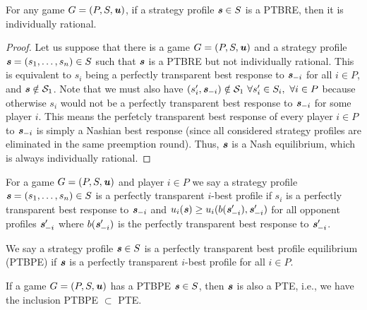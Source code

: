 \begin{lemma}
	For any game $G = (P, S, \boldsymbol{\mathit{u}})$, if a strategy profile $\boldsymbol{\mathit{s}} \in S$ is a PTBRE, then it is individually rational.
\end{lemma}

\begin{proof}
	Let us suppose that there is a game $G = (P, S, \boldsymbol{\mathit{u}})$ and a strategy profile $\boldsymbol{\mathit{s}} = (s_1, \dots, s_n) \in S$ such that $\boldsymbol{\mathit{s}}$ is a PTBRE but not individually rational.
	This is equivalent to $s_i$ being a perfectly transparent best response to $\boldsymbol{\mathit{s}}_{-i}$ for all $i \in P$, and $\boldsymbol{\mathit{s}} \notin \mathcal{S}_1$.
	Note that we must also have $(s_i', \boldsymbol{\mathit{s}}_{-i}) \notin \mathcal{S}_1\ \forall s_i' \in S_i,\ \forall i \in P$ because otherwise $s_i$ would not be a perfectly transparent best response to $\boldsymbol{\mathit{s}}_{-i}$ for some player $i$.
	This means the perfetcly transparent best response of every player $i \in P$ to $\boldsymbol{\mathit{s}}_{-i}$ is simply a Nashian best response (since all considered strategy profiles are eliminated in the same preemption round).
	Thus, $\boldsymbol{\mathit{s}}$ is a Nash equilibrium, which is always individually rational.
\end{proof}

\begin{definition}
	For a game $G = (P, S, \boldsymbol{\mathit{u}})$ and player $i \in P$ we say a strategy profile $\boldsymbol{\mathit{s}} = (s_1, \dots, s_n) \in S$ is a perfectly transparent $i$-best profile if
	$s_i$ is a perfectly transparent best response to $\boldsymbol{\mathit{s}}_{-i}$ and $u_i(\boldsymbol{\mathit{s}}) \ge u_i(b(\boldsymbol{\mathit{s}}'_{-i}), \boldsymbol{\mathit{s}}'_{-i})$ for all opponent profiles $\boldsymbol{\mathit{s}}'_{-i}$ where $b(\boldsymbol{\mathit{s}}'_{-i})$ is the perfectly transparent best response to $\boldsymbol{\mathit{s}}'_{-i}$.
\end{definition}

\begin{definition}
	We say a strategy profile $\boldsymbol{\mathit{s}} \in S$ is a perfectly transparent best profile equilibrium (PTBPE) if $\boldsymbol{\mathit{s}}$ is a perfectly transparent $i$-best profile for all $i \in P$.
\end{definition}

\begin{lemma}
	If a game $G = (P, S, \boldsymbol{\mathit{u}})$ has a PTBPE $\boldsymbol{\mathit{s}} \in S$, then $\boldsymbol{\mathit{s}}$ is also a PTE, i.e., we have the inclusion PTBPE $\subset$ PTE.
\end{lemma}


